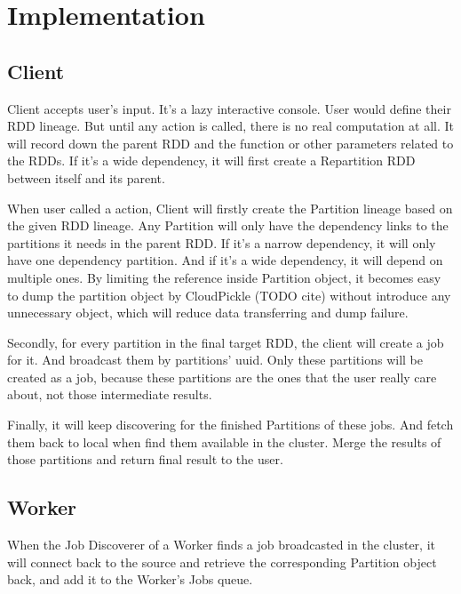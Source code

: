 
\section{Implementation} %
\label{sec:implementation}

\subsection{Client} %
\label{sub:client}
Client accepts user's input. It's a lazy interactive console.
User would define their RDD lineage. But until any action is called, there is no real computation at all.
It will record down the parent RDD and the function or other parameters related to the RDDs\@.
If it's a wide dependency, it will first create a Repartition RDD between itself and its parent.

When user called a action, Client will firstly create the Partition lineage based on the given RDD lineage.
Any Partition will only have the dependency links to the partitions it needs in the parent RDD\@.
If it's a narrow dependency, it will only have one dependency partition.
And if it's a wide dependency, it will depend on multiple ones.
By limiting the reference inside Partition object,
it becomes easy to dump the partition object by CloudPickle (TODO cite) without introduce any unnecessary object,
which will reduce data transferring and dump failure.

Secondly, for every partition in the final target RDD, the client will create a job for it.
And broadcast them by partitions' uuid.
Only these partitions will be created as a job,
because these partitions are the ones that the user really care about, not those intermediate results.

Finally, it will keep discovering for the finished Partitions of these jobs.
And fetch them back to local when find them available in the cluster.
Merge the results of those partitions and return final result to the user.

\subsection{Worker} %
\label{sub:worker}
When the Job Discoverer of a Worker finds a job broadcasted in the cluster,
it will connect back to the source and retrieve the corresponding Partition object back,
and add it to the Worker's Jobs queue.

